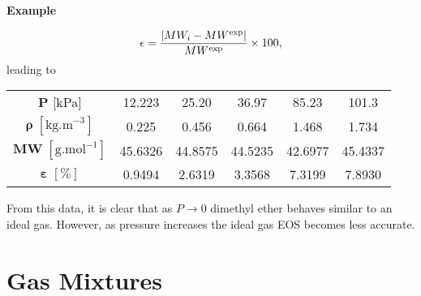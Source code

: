 \begin{MyExample}{\begin{center}{\bf Example}\end{center}}
\begin{enumerate}[a)]
                 \begin{displaymath}
                      \epsilon = \displaystyle\frac{\left| MW_{i} - MW^{\text{exp}}\right|}{MW^{\text{exp}}}\times 100,
                 \end{displaymath}
                 leading to
               \begin{center}
                  \begin{tabular}{c |c c c c c}
                     $\mathbf{P}$ [kPa]                            & 12.223  & 25.20   & 36.97   & 85.23   & 101.3    \\
                     $\mathbf{\rho}\;\left[\text{kg.m}^{-3}\right]$ &  0.225  &  0.456  &  0.664  &  1.468  &   1.734  \\
                     $\mathbf{MW}\;\left[\text{g.mol}^{-1}\right]$  & 45.6326 & 44.8575 & 44.5235 & 42.6977 &  45.4337 \\
                     $\mathbf{\varepsilon}\;\left[\%\right]$       &  0.9494 &  2.6319 &  3.3568 &  7.3199 &   7.8930
                  \end{tabular}
               \end{center}
               From this data, it is clear that as $P\rightarrow 0$ dimethyl ether behaves similar to an ideal gas. However, as pressure increases the ideal gas EOS becomes less accurate.

       \end{enumerate}

   \end{MyExample}
   

   \section{Gas Mixtures}\label{Chapter:Intro_Property_of_Gases:Section:MixtureGases}

